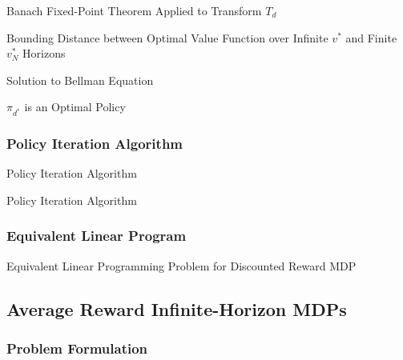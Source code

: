 \documentclass[11pt,a4paper]{article}
\begin{document}
  \begin{theorem}{Banach Fixed-Point Theorem Applied to Transform $T_d$}

  \end{theorem}

  \begin{theorem}{Bounding Distance between Optimal Value Function over Infinite $v^*$ and Finite $v_N^*$ Horizons}

  \end{theorem}

  \begin{theorem}{Solution to Bellman Equation}

  \end{theorem}

  \begin{remark}{$\pi_{d^*}$ is an Optimal Policy}

  \end{remark}

\subsubsection{Policy Iteration Algorithm} %

  \begin{definition}{Policy Iteration Algorithm}

  \end{definition}

  \begin{remark}{Policy Iteration Algorithm}

  \end{remark}

\subsubsection{Equivalent Linear Program} %

  \begin{proposition}{Equivalent Linear Programming Problem for Discounted Reward MDP}

  \end{proposition}

\subsection{Average Reward Infinite-Horizon MDPs} %

\subsubsection{Problem Formulation} %
\end{document}
